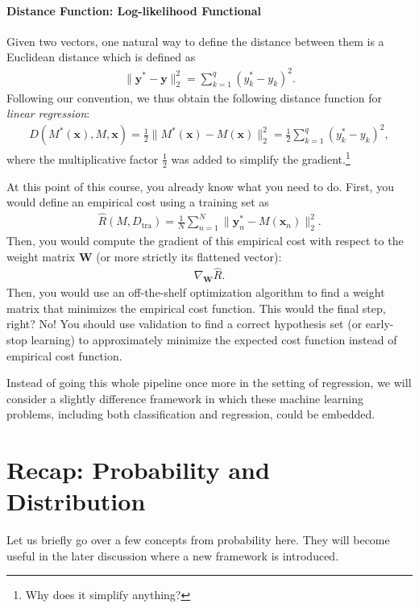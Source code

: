 \documentclass{report}
\newcommand{\vect}[1]{\mathbf{#1}}
\newcommand{\matr}[1]{\mathbf{#1}}
\newcommand{\vx}[0]{\vect{x}}
\newcommand{\vy}[0]{\vect{y}}
\newcommand{\mW}[0]{\matr{W}}
\newcommand{\tra}{\text{tra}}
\begin{document}
\paragraph{Distance Function: Log-likelihood Functional}

Given two vectors, one natural way to define the distance between them is a
Euclidean distance which is defined as
\begin{align*}
    \|\vy^* - \vy\|_2^2 = \sum_{k=1}^q (y^*_k - y_k)^2.
\end{align*}
Following our convention, we thus obtain the following distance function for
{\it linear regression}:
\begin{align}
    \label{eq:linreg_dist}
    D(M^*(\vx), M, \vx) = \frac{1}{2} \|M^*(\vx) - M(\vx)\|_2^2 = 
    \frac{1}{2} \sum_{k=1}^q (y^*_k - y_k)^2,
\end{align}
where the multiplicative factor $\frac{1}{2}$ was added to simplify the
gradient.\footnote{
    Why does it simplify anything?
}

At this point of this course, you already know what you need to do. First, you
would define an empirical cost using a training set as
\begin{align*}
    \hat{R}(M, D_{\tra}) = \frac{1}{N} \sum_{n=1}^N
    \|\vy^*_n - M(\vx_n)\|^2_2.
\end{align*}
Then, you would compute the gradient of this empirical cost with respect to the
weight matrix $\mW$ (or more strictly its flattened vector):
\begin{align*}
    \nabla_{\mW} \hat{R}.
\end{align*}
Then, you would use an off-the-shelf optimization algorithm to find a weight
matrix that minimizes the empirical cost function. This would the final step,
right? No! You should use validation to find a correct hypothesis set (or
early-stop learning) to approximately minimize the expected cost function
instead of empirical cost function.

Instead of going this whole pipeline once more in the setting of regression, we
will consider a slightly difference framework in which these machine learning
problems, including both classification and regression, could be embedded. 

\section{Recap: Probability and Distribution}

Let us briefly go over a few concepts from probability here. They will become
useful in the later discussion where a new framework is introduced. 
\end{document}
